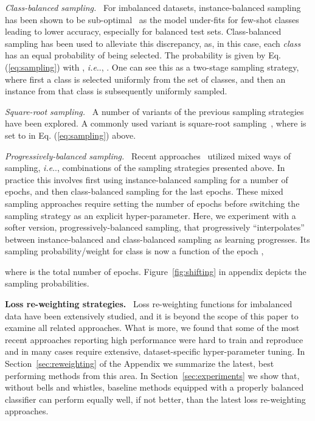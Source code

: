 \documentclass[dvipsnames]{article} \usepackage{iclr2020_conference, times}
\makeatletter
\DeclareRobustCommand\onedot{\futurelet\@let@token\@onedot}
\def\@onedot{\ifx\@let@token.\else.\null\fi\xspace}
\def\ie{\emph{i.e}\onedot} \def\Ie{\emph{I.e}\onedot}
\newcommand{\header}[1]{\noindent\textbf{#1.}~}
\newcommand{\headerit}[1]{\noindent\textit{#1.}~}
\newcommand{\uniform}{instance-balanced\xspace}
\newcommand{\balanced}{class-balanced\xspace}
\newcommand{\Balanced}{Class-balanced\xspace}
\newcommand{\squareroot}{square-root\xspace}
\newcommand{\Squareroot}{Square-root\xspace}
\newcommand{\shift}{progressively-balanced\xspace}
\newcommand{\Shift}{Progressively-balanced\xspace}
\makeatother
\begin{document}
\headerit{\Balanced sampling}
For imbalanced datasets, \uniform sampling   has been shown to be sub-optimal~\citep{huang2016learning,wang2017learning} as the model under-fits for few-shot classes leading to lower accuracy, especially for balanced test sets. \Balanced sampling has been used to alleviate this discrepancy, as, in this case, each \emph{class} has an equal probability of being selected. The probability  is given by Eq. (\ref{eq:sampling}) with , \ie, . One can see this as a two-stage sampling strategy, where first a class is selected uniformly from the set of classes, and then an instance from that class is subsequently uniformly sampled. 

\headerit{\Squareroot sampling}
A number of variants of the previous sampling strategies have been explored. A commonly used variant is \squareroot sampling~\citep{mikolov2013distributed, mahajan2018exploring}, where  is set to  in Eq. (\ref{eq:sampling}) above.


\headerit{\Shift sampling}
Recent approaches~\citep{cui2018large,cao2019learning} utilized mixed ways of sampling, \ie, combinations of the sampling strategies presented above. In practice this involves first using \uniform sampling for a number of epochs, and then \balanced sampling for the last epochs. These mixed sampling approaches require setting the number of epochs before switching the sampling strategy as an explicit hyper-parameter. Here, we experiment with a softer version,  \shift sampling,  that   progressively ``interpolates'' between \uniform  and \balanced sampling as learning progresses. Its sampling probability/weight  for class  is now a function of the epoch ,

where   is the total number of epochs. Figure~\ref{fig:shifting} in appendix depicts the sampling probabilities. 

\header{Loss re-weighting strategies}
Loss re-weighting functions for imbalanced data have been extensively studied, and it is beyond the scope of this paper to examine all related approaches. What is more, we found that some of the most recent approaches reporting high performance were hard to train and reproduce and in many cases require extensive, dataset-specific hyper-parameter tuning. In Section~\ref{sec:reweighting} of the Appendix we summarize the latest, best performing methods from this area. {In Section~\ref{sec:experiments} we show that, without bells and whistles, baseline methods equipped with a properly balanced classifier can perform equally well, if not better, than the latest loss re-weighting approaches.}
 
\end{document}
